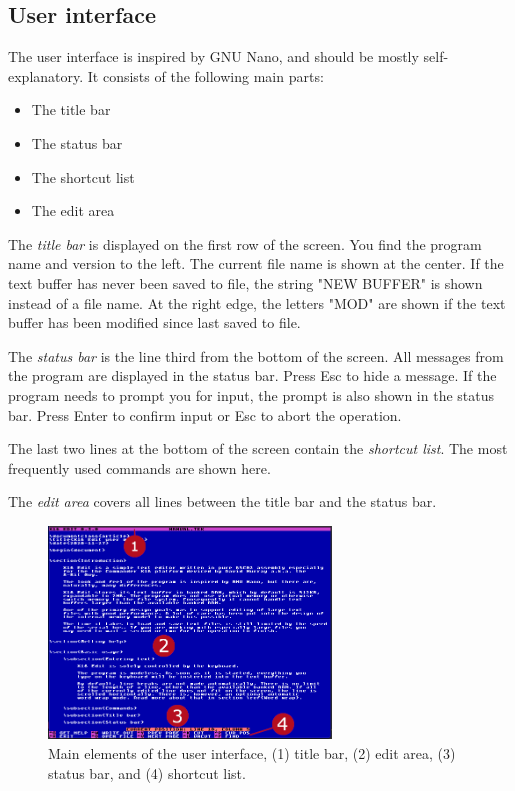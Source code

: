 \documentclass{article}
\begin{document}
    \subsection{User interface}
	
	The user interface is inspired by GNU Nano, and should be mostly self-explanatory. It consists of the following main parts:
	
	\begin{itemize}
		\item The title bar
		\item The status bar
		\item The shortcut list
		\item The edit area
	\end{itemize}
	
	\noindent The \textit{title bar} is displayed on the first row of the screen. You find the program name and version to the left. 
	The current file name is shown at the center. If the text buffer has never been saved to file, the string "NEW BUFFER" is
	shown instead of a file name. At the right edge, the letters "MOD" are shown if the text buffer has been modified
	since last saved to file.
	
	The \textit{status bar} is the line third from the bottom of the screen. All messages from the program are displayed in
	the status bar. Press Esc to hide a message. If the program needs to prompt you for input, the prompt is also shown in the status bar. 
	Press Enter to confirm input or Esc to abort the operation.
	
	The last two lines at the bottom of the screen contain the \textit{shortcut list}. The most frequently used commands are
	shown here.
	
	The \textit{edit area} covers all lines between the title bar and the status bar. 

    \begin{figure}[H]
        \caption{Main elements of the user interface, (1) title bar, (2) edit area, (3) status bar, and (4) shortcut list.}
        \centering\includegraphics[width=0.67\textwidth]{interface.png}
    \end{figure}
	
\end{document}
